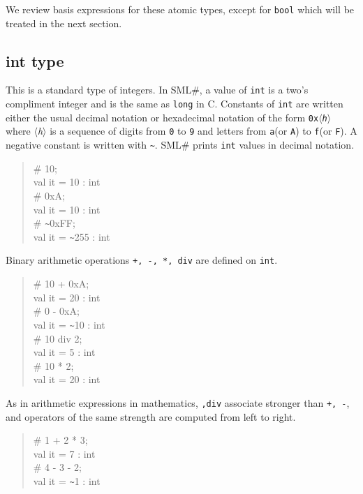 \documentclass{jbook}
\newcommand{\smlsharp}{SML\#}
\newcommand{\code}[1]{\mbox{\large\tt #1}}
\newcommand{\nonterm}[1]{\mbox{$\langle$}{\it #1}\mbox{$\rangle$}}
\newenvironment{program}{\begin{quote}\begin{tt}}%
                        {\end{tt}\end{quote}}
\begin{document}
	We review basis expressions for these atomic types, except for
{\tt bool} which will be treated in the next section.

\subsection{int type}
	This is a standard type of integers.
	In \smlsharp{}, a value of {\tt int} is a two's compliment
integer and is the same as \code{long} in C.
	Constants of {\tt int} are written either the usual decimal
notation or hexadecimal notation of the form {\tt 0x\nonterm{h}} 
where \nonterm{h} is a sequence of digits from {\tt 0} to {\tt 9} and
letters from {\tt a}(or {\tt A}) to {\tt f}(or {\tt F}).
	A negative constant is written with \verb|~|.
	\smlsharp{} prints {\tt int} values in decimal notation.
\begin{program}
\# 10;\\
val it = 10 : int\\
\# 0xA;\\
val it = 10 : int\\
\# \verb|~|0xFF;\\
val it = \verb|~|255 : int
\end{program}
	Binary arithmetic operations {\tt +, -, *, div} are defined on 
{\tt int}.
\begin{program}
\# 10 + 0xA;\\
val it = 20 : int\\
\# 0 - 0xA;\\
val it = \verb|~|10 : int\\
\# 10 div 2;\\
val it = 5 : int\\
\# 10 * 2;\\
val it = 20 : int
\end{program}
	As in arithmetic expressions in mathematics, {\tt *,div}
associate stronger than {\tt +, -}, and operators of the same strength
are computed from left to right.
\begin{program}
\# 1 + 2 * 3;\\
val it = 7 : int\\
\# 4 - 3 - 2;\\
val it = \verb|~|1 : int
\end{program}
\end{document}

